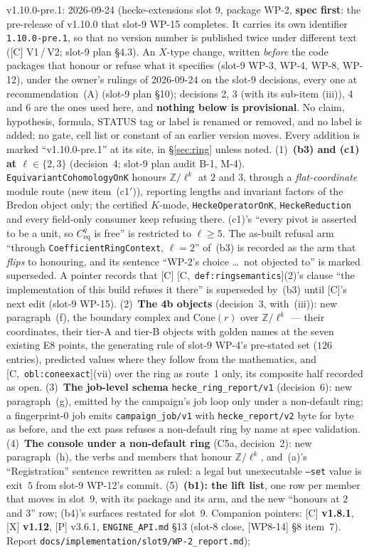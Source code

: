 \documentclass[11pt]{article}
\theoremstyle{remark}
\newcommand{\Z}{\mathbb{Z}}
\newcommand{\HA}[1]{[C,~\texttt{#1}]}      %
\begin{document}
v1.10.0-pre.1: 2026-09-24 (hecke-extensions slot 9, package WP-2, \textbf{spec
first}: the pre-release of v1.10.0 that slot-9 WP-15 completes. It carries its own identifier
\texttt{1.10.0-pre.1}, so that no version number is published twice under different text ([C]
V1\,/\,V2; slot-9 plan \S4.3). An $X$-type change, written \emph{before} the code packages that
honour or refuse what it specifies (slot-9 WP-3, WP-4, WP-8, WP-12), under the owner's rulings of
2026-09-24 on the slot-9 decisions, every one at recommendation~(A) (slot-9 plan \S10); decisions
2, 3 (with its sub-item (iii)), 4 and 6 are the ones used here, and \textbf{nothing below is
provisional}. No claim, hypothesis, formula, STATUS tag or label is renamed or removed, and no label
is added; no gate, cell list or constant of an earlier version moves. Every addition is marked
``v1.10.0-pre.1'' at its site, in \S\ref{sec:ring} unless noted.
(1)~\textbf{(b3) and (c1) at $\ell\in\{2,3\}$} (decision~4; slot-9 plan audit B-1, M-4).
\texttt{EquivariantCohomologyOnK} honours $\Z/\ell^k$ at $2$ and $3$, through a
\emph{flat-coordinate} module route (new item~(c1$'$)), reporting lengths and invariant factors
of the Bredon object only; the certified $K$-mode, \texttt{HeckeOperatorOnK},
\texttt{HeckeReduction} and every field-only consumer keep refusing there. (c1)'s ``every pivot is
asserted to be a unit, so $C^q_{\mathrm{eq}}$ is free'' is restricted to $\ell\ge5$. The as-built
refusal arm ``through \texttt{CoefficientRingContext}, $\ell=2$'' of~(b3) is recorded as the arm
that \emph{flips} to honouring, and its sentence ``WP-2's choice \ldots\ not objected to'' is marked
superseded. A pointer records that [C] \HA{def:ringsemantics}(2)'s clause ``the implementation of
this build refuses it there'' is superseded by~(b3) until [C]'s next edit (slot-9 WP-15).
(2)~\textbf{The 4b objects} (decision~3, with~(iii)): new paragraph~(f), the boundary complex and
$\mathrm{Cone}(r)$ over $\Z/\ell^k$ --- their coordinates, their tier-A and tier-B objects with golden
names at the seven existing E8 points, the generating rule of slot-9 WP-4's pre-stated set
($126$ entries), predicted values where they follow from the mathematics, and
\HA{obl:coneexact}(vii) over the ring as route~1 only, its composite half recorded as open.
(3)~\textbf{The job-level schema} \texttt{hecke\_ring\_report/v1} (decision~6): new
paragraph~(g), emitted by the campaign's job loop only under a non-default ring; a
fingerprint-$0$ job emits \texttt{campaign\_job/v1} with \texttt{hecke\_report/v2} byte for byte
as before, and the ext pass refuses a non-default ring by name at spec validation.
(4)~\textbf{The console under a non-default ring} (C5a, decision~2): new paragraph~(h), the verbs
and members that honour $\Z/\ell^k$, and~(a)'s ``Registration'' sentence rewritten as ruled: a
legal but unexecutable \texttt{--set} value is exit~$5$ from slot-9 WP-12's commit.
(5)~\textbf{(b1): the lift list}, one row per member that moves in slot~9, with its package and
its arm, and the new ``honours at $2$ and $3$'' row; (b4)'s surfaces restated for slot~9.
Companion pointers: [C] \textbf{v1.8.1}, [X] \textbf{v1.12}, [P] v3.6.1,
\texttt{ENGINE\_API.md} \S13 (slot-8 close, [WP8-14] \S8 item~7). Report
\texttt{docs/implementation/slot9/WP-2\_report.md});
\end{document}
